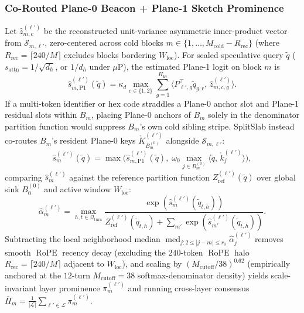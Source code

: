 \documentclass[10pt,journal,compsoc]{IEEEtran}
\theoremstyle{definition}
\theoremstyle{remark}
\newcommand{\SplitSlab}{\textup{\textsc{SplitSlab}}}
\newcommand{\RoPE}{\operatorname{RoPE}}
\def\SplitSlab{SplitSlab}%
\begin{document}
\subsubsection{Co-Routed Plane-0 Beacon + Plane-1 Sketch Prominence}
Let $\hat{z}_{m,c}^{(\ell')}$ be the reconstructed unit-variance asymmetric inner-product vector from $\mathcal{S}_{m,\ell'}$, zero-centered across cold blocks $m \in \{1,\dots,M_{\mathrm{cold}}-R_{\mathrm{rec}}\}$ (where $R_{\mathrm{rec}} = \lceil 240/M \rceil$ excludes blocks bordering $W_{\mathrm{loc}}$). For scaled speculative query $\tilde{q}$ ($s_{\mathrm{attn}} = 1/\sqrt{d_h}$, or $1/d_h$ under $\mu\text{P}$), the estimated Plane-1 logit on block $m$ is
\begin{equation}\label{eq:est_logit}
\hat{s}_{m,\mathrm{P1}}^{(\ell')}(\tilde{q}) = \kappa_d \max_{c \in \{1,2\}} \sum_{g=1}^{H_{\mathrm{kv}}} \big\langle P_{\ell',g}^\top \tilde{q}_{g,r},\, \hat{z}_{m,c,g}^{(\ell')} \big\rangle.
\end{equation}
If a multi-token identifier or hex code straddles a Plane-0 anchor slot and Plane-1 residual slots within $B_m$, placing Plane-0 anchors of $B_m$ solely in the denominator partition function would suppress $B_m$'s own cold sibling stripe. \SplitSlab{} instead co-routes $B_m$'s resident Plane-0 keys $\mathring{K}_{B_m^{(0)}}^{(\ell')}$ alongside $\mathcal{S}_{m,\ell'}$:
\begin{equation}\label{eq:coroute}
\hat{s}_m^{(\ell')}(\tilde{q}) = \max\!\Big(\hat{s}_{m,\mathrm{P1}}^{(\ell')}(\tilde{q}),\; \omega_0 \max_{j \in B_m^{(0)}} \langle \tilde{q},\, \mathring{k}_j^{(\ell')} \rangle\Big),
\end{equation}
comparing $\hat{s}_m^{(\ell')}$ against the reference partition function $Z_{\mathrm{ref}}^{(\ell')}(\tilde{q})$ over global sink $B_0^{(0)}$ and active window $W_{\mathrm{loc}}$:
\begin{equation}\label{eq:alpha_hat}
\hat{\alpha}_m^{(\ell')} = \max_{h, t \in \mathcal{Q}_{\mathrm{turn}}} \frac{\exp(\hat{s}_m^{(\ell')}(\tilde{q}_{t,h}))}{Z_{\mathrm{ref}}^{(\ell')}(\tilde{q}_{t,h}) + \sum_{m'} \exp(\hat{s}_{m'}^{(\ell')}(\tilde{q}_{t,h}))}.
\end{equation}
Subtracting the local neighborhood median $\operatorname{med}_{j: 2 \le |j-m| \le r_0} \hat{\alpha}_j^{(\ell')}$ removes smooth $\RoPE$ recency decay (excluding the $240$-token $\RoPE$ halo $R_{\mathrm{rec}} = \lceil 240/M\rceil$ adjacent to $W_{\mathrm{loc}}$), and scaling by $(M_{\mathrm{cutoff}}/38)^{0.62}$ (empirically anchored at the $12$-turn $M_{\mathrm{cutoff}} = 38$ softmax-denominator density) yields scale-invariant layer prominence $\pi_m^{(\ell')}$ and running cross-layer consensus $\bar{\Pi}_m = \frac{1}{|\mathcal{L}|}\sum_{\ell' \in \mathcal{L}} \pi_m^{(\ell')}$.
\end{document}
